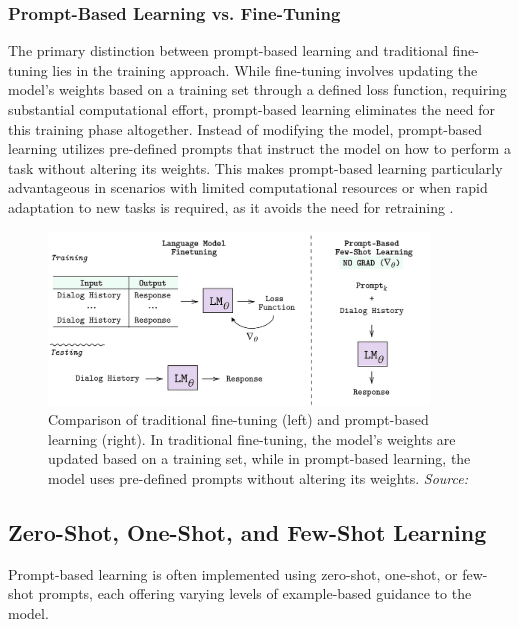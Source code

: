 \subsubsection{Prompt-Based Learning vs. Fine-Tuning}

The primary distinction between prompt-based learning and traditional fine-tuning lies in the training approach. While fine-tuning involves updating the model's weights based on a training set through a defined loss function, requiring substantial computational effort, prompt-based learning eliminates the need for this training phase altogether. Instead of modifying the model, prompt-based learning utilizes pre-defined prompts that instruct the model on how to perform a task without altering its weights. This makes prompt-based learning particularly advantageous in scenarios with limited computational resources or when rapid adaptation to new tasks is required, as it avoids the need for retraining \cite{madotto2021few}. 

\begin{figure}[h]
    \centering
    \includegraphics[width=0.9\textwidth]{images/llms/fine-tuning-vs-prompt-learning.png}
    \caption{Comparison of traditional fine-tuning (left) and prompt-based learning (right). In traditional fine-tuning, the model's weights are updated based on a training set, while in prompt-based learning, the model uses pre-defined prompts without altering its weights. \textit{Source:} \cite{madotto2021few}}
    \label{fig:fine_tuning_vs_prompt_learning}
\end{figure}

\subsection{Zero-Shot, One-Shot, and Few-Shot Learning}

Prompt-based learning is often implemented using zero-shot, one-shot, or few-shot prompts, each offering varying levels of example-based guidance to the model.

